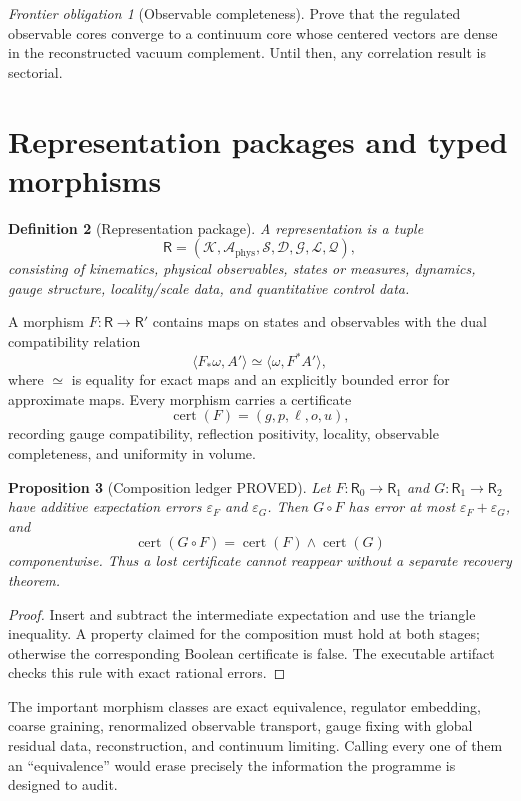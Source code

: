 \documentclass[11pt]{article}
\newcommand{\Pstatus}{\textcolor{proved}{\textsf{PROVED}}}
\newcommand{\Aphys}{\mathcal A_{\mathrm{phys}}}
\newcommand{\R}{\mathsf R}
\newtheorem{definition}{Definition}[section]
\newtheorem{proposition}[definition]{Proposition}
\theoremstyle{remark}
\newtheorem{obligation}[definition]{Frontier obligation}
\begin{document}
\begin{obligation}[Observable completeness]
Prove that the regulated observable cores converge to a continuum core whose
centered vectors are dense in the reconstructed vacuum complement.  Until
then, any correlation result is sectorial.
\end{obligation}

\section{Representation packages and typed morphisms}

\begin{definition}[Representation package]
A representation is a tuple
\[
 \R=(\mathcal K,\Aphys,\mathcal S,\mathcal D,\mathcal G,
       \mathcal L,\mathcal Q),
\]
consisting of kinematics, physical observables, states or measures, dynamics,
gauge structure, locality/scale data, and quantitative control data.
\end{definition}

A morphism $F:\R\to\R'$ contains maps on states and observables with the dual
compatibility relation
\[
 \langle F_{\!*}\omega,A'\rangle
   \simeq \langle\omega,F^*A'\rangle,
\]
where $\simeq$ is equality for exact maps and an explicitly bounded error for
approximate maps.  Every morphism carries a certificate
\[
 \operatorname{cert}(F)=(g,p,\ell,o,u),
\]
recording gauge compatibility, reflection positivity, locality, observable
completeness, and uniformity in volume.

\begin{proposition}[Composition ledger \Pstatus]
Let $F:\R_0\to\R_1$ and $G:\R_1\to\R_2$ have additive expectation errors
$\varepsilon_F$ and $\varepsilon_G$.  Then $G\circ F$ has error at most
$\varepsilon_F+\varepsilon_G$, and
\[
 \operatorname{cert}(G\circ F)
 =\operatorname{cert}(F)\wedge\operatorname{cert}(G)
\]
componentwise.  Thus a lost certificate cannot reappear without a separate
recovery theorem.
\end{proposition}

\begin{proof}
Insert and subtract the intermediate expectation and use the triangle
inequality.  A property claimed for the composition must hold at both stages;
otherwise the corresponding Boolean certificate is false.  The executable
artifact checks this rule with exact rational errors.
\end{proof}

The important morphism classes are exact equivalence, regulator embedding,
coarse graining, renormalized observable transport, gauge fixing with global
residual data, reconstruction, and continuum limiting.  Calling every one of
them an ``equivalence'' would erase precisely the information the programme is
designed to audit.
\end{document}
